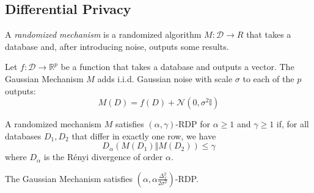 \documentclass[acmsmall,sigconf]{acmart}
\renewcommand{\implies}{\rightarrow}
\newcommand{\db}{D}
\newcommand{\dbs}{\mathcal{D}}
\newcommand{\prob}[1]{\text{Pr}[#1]}
\begin{document}
\subsection{Differential Privacy}



A \emph{randomized mechanism} is a randomized algorithm $M : \dbs \implies R$ that takes a database and, after introducing noise, outputs some results.

\begin{definition}\label{def:gm}
Let $f : \dbs \implies \mathbb{R}^p$ be a function that takes a database and outputs a vector. The Gaussian Mechanism $M$ adds i.i.d. Gaussian noise with scale $\sigma$ to each of the $p$ outputs:
\[
M(\db) = f(\db) + \mathcal{N}(0, \sigma^2 \mathbb{I})
\]
\end{definition}

\begin{definition}\label{def:rdp}
A randomized mechanism $M$ satisfies $(\alpha,\gamma)$-RDP for $\alpha \geq 1$ and $\gamma \geq 1$ if, for all databases $\db_1,\db_2$ that differ in exactly one row, we have
\[
D_\alpha(M(\db_1) \Vert M(\db_2)) \leq \gamma
\]
where $D_\alpha$ is the R\'enyi divergence\cite{van2014renyi} of order $\alpha$.
\end{definition}

\begin{theorem}
The Gaussian Mechanism satisfies $(\alpha, \alpha \frac{\Delta^2_f}{2 \sigma^2})$-RDP.
\end{theorem}
\end{document}
